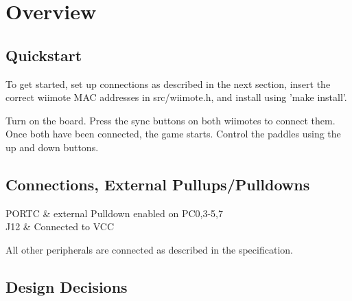 \documentclass[12pt,a4paper,titlepage,oneside]{article}
\begin{document}
\MakeTitleAndTOC




\section{Overview}

\subsection{Quickstart}

To get started, set up connections as described in the next section,
insert the correct wiimote MAC addresses in src/wiimote.h, and install
using 'make install'. 

Turn on the board. Press the sync buttons on both wiimotes to connect them.
Once both have been connected, the game starts. Control the paddles using
the up and down buttons.

\subsection{Connections,  External Pullups/Pulldowns}

PORTC & external Pulldown enabled on PC0,3-5,7 \\
J12 & Connected to VCC \\
\eConnections

All other peripherals are connected as described in the specification.

\subsection{Design Decisions}
\end{document}

